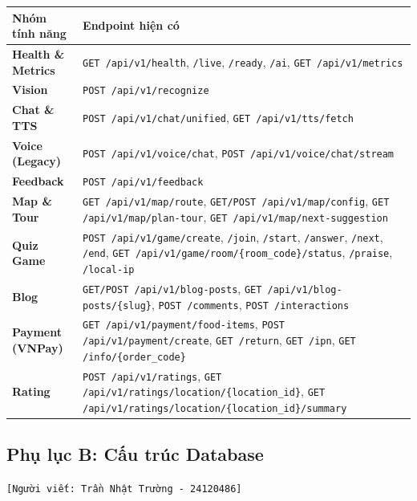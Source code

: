 \begin{table}[H]
    \centering
    \renewcommand{\arraystretch}{1.3}
    \begin{tabular}{|p{2.5cm}|p{12cm}|}
        \hline
        \textbf{Nhóm tính năng} & \textbf{Endpoint hiện có} \\ \hline
        \textbf{Health \& Metrics} & \texttt{GET /api/v1/health}, \texttt{/live}, \texttt{/ready}, \texttt{/ai}, \texttt{GET /api/v1/metrics} \\ \hline
        \textbf{Vision} & \texttt{POST /api/v1/recognize} \\ \hline
        \textbf{Chat \& TTS} & \texttt{POST /api/v1/chat/unified}, \texttt{GET /api/v1/tts/fetch} \\ \hline
        \textbf{Voice (Legacy)} & \texttt{POST /api/v1/voice/chat}, \texttt{POST /api/v1/voice/chat/stream} \\ \hline
        \textbf{Feedback} & \texttt{POST /api/v1/feedback} \\ \hline
        \textbf{Map \& Tour} & \texttt{GET /api/v1/map/route}, \texttt{GET/POST /api/v1/map/config}, \texttt{GET /api/v1/map/plan-tour}, \texttt{GET /api/v1/map/next-suggestion} \\ \hline
        \textbf{Quiz Game} & \texttt{POST /api/v1/game/create}, \texttt{/join}, \texttt{/start}, \texttt{/answer}, \texttt{/next}, \texttt{/end}, \texttt{GET /api/v1/game/room/\{room\_code\}/status}, \texttt{/praise}, \texttt{/local-ip} \\ \hline
        \textbf{Blog} & \texttt{GET/POST /api/v1/blog-posts}, \texttt{GET /api/v1/blog-posts/\{slug\}}, \texttt{POST /comments}, \texttt{POST /interactions} \\ \hline
        \textbf{Payment (VNPay)} & \texttt{GET /api/v1/payment/food-items}, \texttt{POST /api/v1/payment/create}, \texttt{GET /return}, \texttt{GET /ipn}, \texttt{GET /info/\{order\_code\}} \\ \hline
        \textbf{Rating} & \texttt{POST /api/v1/ratings}, \texttt{GET /api/v1/ratings/location/\{location\_id\}}, \texttt{GET /api/v1/ratings/location/\{location\_id\}/summary} \\ \hline
    \end{tabular}
\end{table}

\subsection{Phụ lục B: Cấu trúc Database}
\texttt{[Người viết: Trần Nhật Trường - 24120486]}

